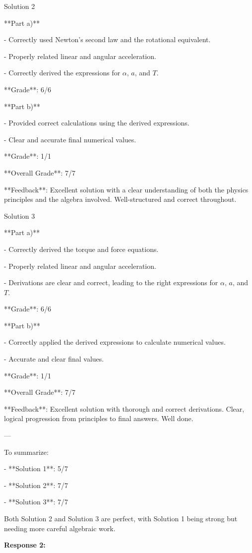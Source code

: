 \documentclass[a4paper,11pt]{article}
\begin{document}
Solution 2

**Part a)**

- Correctly used Newton's second law and the rotational equivalent.

- Properly related linear and angular acceleration.

- Correctly derived the expressions for \( \alpha \), \( a \), and \( T \).

**Grade**: 6/6

**Part b)**

- Provided correct calculations using the derived expressions.

- Clear and accurate final numerical values.

**Grade**: 1/1

**Overall Grade**: 7/7

**Feedback**: Excellent solution with a clear understanding of both the physics principles and the algebra involved. Well-structured and correct throughout.

Solution 3

**Part a)**

- Correctly derived the torque and force equations.

- Properly related linear and angular acceleration.

- Derivations are clear and correct, leading to the right expressions for \( \alpha \), \( a \), and \( T \).

**Grade**: 6/6

**Part b)**

- Correctly applied the derived expressions to calculate numerical values.

- Accurate and clear final values.

**Grade**: 1/1

**Overall Grade**: 7/7

**Feedback**: Excellent solution with thorough and correct derivations. Clear, logical progression from principles to final answers. Well done.

---

To summarize:

- **Solution 1**: 5/7

- **Solution 2**: 7/7

- **Solution 3**: 7/7

Both Solution 2 and Solution 3 are perfect, with Solution 1 being strong but needing more careful algebraic work.

\bigskip
\textbf{Response 2:}
\end{document}
